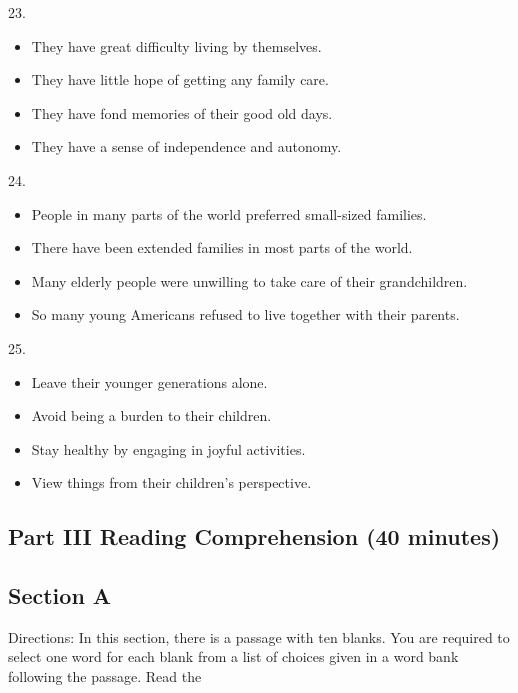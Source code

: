 \documentclass[UTF8,11pt]{ctexart}
\begin{document}
23.


\begin{itemize}[leftmargin=2em,itemsep=.2em,topsep=.4em]\item[A.] They have great difficulty living by themselves.
\item[B.] They have little hope of getting any family care.
\item[C.] They have fond memories of their good old days.
\item[D.] They have a sense of independence and autonomy.
\end{itemize}

24.


\begin{itemize}[leftmargin=2em,itemsep=.2em,topsep=.4em]\item[A.] People in many parts of the world preferred small-sized families.
\item[B.] There have been extended families in most parts of the world.
\item[C.] Many elderly people were unwilling to take care of their grandchildren.
\item[D.] So many young Americans refused to live together with their parents.
\end{itemize}

25.


\begin{itemize}[leftmargin=2em,itemsep=.2em,topsep=.4em]\item[A.] Leave their younger generations alone.
\item[B.] Avoid being a burden to their children.
\item[C.] Stay healthy by engaging in joyful activities.
\item[D.] View things from their children’s perspective.
\end{itemize}

\subsection*{Part III Reading Comprehension (40 minutes)}


\subsection*{Section A}


Directions: In this section, there is a passage with ten blanks. You are required to select one word for each blank from a list of choices given in a word bank following the passage. Read the
\end{document}
